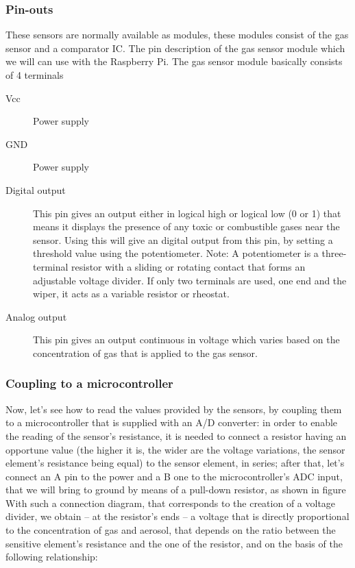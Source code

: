 \documentclass{article}\usepackage[]{graphicx}\usepackage[]{color}
\begin{document}
\subsubsection{Pin-outs}

These sensors are normally available as modules, these modules consist of the gas sensor and a comparator IC. The pin description of the gas sensor module which we will can use with the Raspberry Pi. The gas sensor module basically consists of 4 terminals

\begin{description}
  \item[Vcc] Power supply
  \item[GND] Power supply
  \item[Digital output] This pin gives an output either in logical high or logical low (0 or 1) that means it displays the presence of any toxic or combustible gases near the sensor. Using this will give an digital output from this pin, by setting a threshold value using the potentiometer. Note: A potentiometer is a three-terminal resistor with a sliding or rotating contact that forms an adjustable voltage divider. If only two terminals are used, one end and the wiper, it acts as a variable resistor or rheostat.
  \item[Analog output] This pin gives an output continuous in voltage which varies based on the concentration of gas that is applied to the gas sensor.
\end{description}


\subsubsection{Coupling to a microcontroller}
Now, let's see how to read the values provided by the sensors, by coupling them to a microcontroller that is supplied with an A/D converter: in order to enable the reading of the sensor's resistance, it is needed to connect a resistor having an opportune value (the higher it is, the wider are the voltage variations, the sensor element's resistance being equal) to the sensor element, in series; after that, let's connect an A pin to the power and a B one to the microcontroller's ADC input, that we will bring to ground by means of a pull-down resistor, as shown in figure With such a connection diagram, that corresponds to the creation of a voltage divider, we obtain – at the resistor's ends – a voltage that is directly proportional to the concentration of gas and aerosol, that depends on the ratio between the sensitive element's resistance and the one of the resistor, and on the basis of the following relationship:
\end{document}
